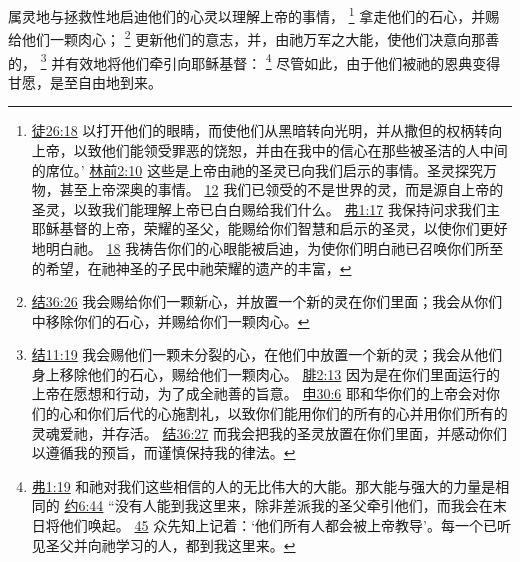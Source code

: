 \documentclass[12pt, a4paper, oneside]{ctexart}
\begin{document}
	属灵地与拯救性地启迪他们的心灵以理解上帝的事情，
	\footnote {
		\href{https://biblehub.com/acts/26-18.htm}{徒26:18} 以打开他们的眼睛，而使他们从黑暗转向光明，并从撒但的权柄转向上帝，以致他们能领受罪恶的饶恕，并由在我中的信心在那些被圣洁的人中间的席位。’
		\href{https://biblehub.com/1_corinthians/2-10.htm}{林前2:10} 这些是上帝由祂的圣灵已向我们启示的事情。圣灵探究万物，甚至上帝深奥的事情。
		\href{https://biblehub.com/1_corinthians/2-12.htm}{12} 我们已领受的不是世界的灵，而是源自上帝的圣灵，以致我们能理解上帝已白白赐给我们什么。
		\href{https://biblehub.com/ephesians/1-17.htm}{弗1:17} 我保持问求我们主耶稣基督的上帝，荣耀的圣父，能赐给你们智慧和启示的圣灵，以使你们更好地明白祂。
		\href{https://biblehub.com/ephesians/1-18.htm}{18} 我祷告你们的心眼能被启迪，为使你们明白祂已召唤你们所至的希望，在祂神圣的子民中祂荣耀的遗产的丰富，
	}
	拿走他们的石心，并赐给他们一颗肉心；
	\footnote {
		\href{https://biblehub.com/ezekiel/36-26.htm}{结36:26} 我会赐给你们一颗新心，并放置一个新的灵在你们里面；我会从你们中移除你们的石心，并赐给你们一颗肉心。
	}
	更新他们的意志，并，由祂万军之大能，使他们决意向那善的，
	\footnote {
		\href{https://biblehub.com/ezekiel/11-19.htm}{结11:19} 我会赐他们一颗未分裂的心，在他们中放置一个新的灵；我会从他们身上移除他们的石心，赐给他们一颗肉心。
		\href{https://biblehub.com/philippians/2-13.htm}{腓2:13} 因为是在你们里面运行的上帝在愿想和行动，为了成全祂善的旨意。
		\href{https://biblehub.com/deuteronomy/30-6.htm}{申30:6} 耶和华你们的上帝会对你们的心和你们后代的心施割礼，以致你们能用你们的所有的心并用你们所有的灵魂爱祂，并存活。
		\href{https://biblehub.com/ezekiel/36-27.htm}{结36:27} 而我会把我的圣灵放置在你们里面，并感动你们以遵循我的预旨，而谨慎保持我的律法。
	}
	并有效地将他们牵引向耶稣基督：
	\footnote {
		\href{https://biblehub.com/ephesians/1-19.htm}{弗1:19} 和祂对我们这些相信的人的无比伟大的大能。那大能与强大的力量是相同的
		\href{https://biblehub.com/john/6-44.htm}{约6:44} “没有人能到我这里来，除非差派我的圣父牵引他们，而我会在末日将他们唤起。
		\href{https://biblehub.com/john/6-45.htm}{45} 众先知上记着：‘他们所有人都会被上帝教导’。每一个已听见圣父并向祂学习的人，都到我这里来。
	}
	尽管如此，由于他们被祂的恩典变得甘愿，是至自由地到来。
\end{document}
